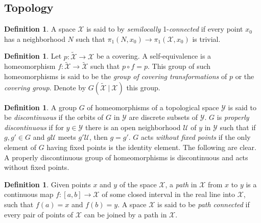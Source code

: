 \documentclass[10]{article}
\theoremstyle{plain}
\theoremstyle{definition}
\newtheorem{defn}[prop]{Definition}%
\theoremstyle{definition}
\newtheorem{definition}[prop]{Definition}
\numberwithin{equation}{section}
\newcommand{\7}{\dagger}                     %
\newcommand{\8}{\bullet}                     %
\renewcommand{\.}{\cdot}                     %
\renewcommand{\:}{\colon}                    %
\newcommand{\sU}{\mathcal{U}}       %
\newcommand{\sX}{\mathcal{X}}       %
\newcommand{\sY}{\mathcal{Y}}       %
\renewcommand{\:}{\colon}           %
\begin{document}
	\begin{appendices}
	\section{Topology}
	\begin{defn}\label{top_semi1_defn}\cite{spanier:at}
	A space $\sX$ is said to by \textit{semilocally} 1-\textit{connected} if every point $x_0$ has a neighborhood $N$ such that $\pi_1\left( N, x_0\right) \to \pi_1\left(\sX, x_0 \right)$ is trivial. 
\end{defn} 

	\begin{defn}\label{top_covering_transformations_group_defn}\cite{spanier:at}
		Let $p: \mathcal{\widetilde{X}} \to \mathcal{X}$ be a covering.  A self-equivalence is a homeomorphism $f:\mathcal{\widetilde{X}}\to\mathcal{\widetilde{X}}$ such that $p \circ f = p$. This group of such homeomorphisms is said to be the {\it group of covering transformations} of $p$ or the {\it covering group}. Denote by $G\left( \mathcal{\widetilde{X}}~|~\mathcal{X}\right)$ this group.
	\end{defn}
	
	\begin{definition}\label{top_properly_disc_defn}\cite{spanier:at}
		A group $G$ of homeomorphisms of a topological space $\sY$ is said to be  
		\textit{discontinuous} if the orbits of $G$ in $\sY$ are discrete subsets of $\sY$. $G$ is \textit{properly 
			discontinuous} if for $y \in \sY$ there is an open neighborhood $\sU$ of $y$ in $\sY$ such 
		that if $g, g' \in  G$ and $g\sU$ meets $g'\sU$, then $g = g'$. $G$ acts \textit{ without fixed points} 
		if the only element of $G$ having fixed points is the identity element. The 
		following are clear. 
		A properly discontinuous group of homeomorphisms is discontinuous 
		and acts without fixed points. 
	\end{definition}
	
	\begin{definition}\label{top_path_connected_defn}\cite{munkres:topology}
		Given points $x$ and $y$ of the space $\sX$, a \textit{path} in $\sX$ from $x$ to $y$ is a continuous map $f: \left[a, b\right]\to \sX$ of some closed interval in the real line into $\sX$, such
		that $f(a) = x$ and $f(b) = y$. A space $\sX$ is said to be \textit{path connected} if every pair of
		points of $\sX$ can be joined by a path in $\sX$.
	\end{definition}
	

\end{appendices}
\end{document}
